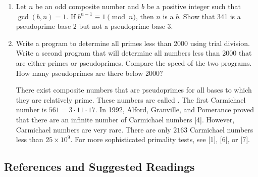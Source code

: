 {\begin{enumerate}
\begin{minipage}[t]{4.6in}
\begin{minipage}[t]{2.25in}
\begin{itemize}
 \item[{\bf (f)}]
631
 
\end{itemize}
\end{minipage}
\end{minipage}
 
\vspace{2pt}        %
 
 
\bf\item\rm
Let $n$ be an odd composite number and $b$ be a positive integer such
that $\gcd(b, n) = 1$. If $b^{n-1} \equiv 1 \pmod{n}$, then $n$ is a
 $b$. Show that 341 is a pseudoprime base 2 but
not a pseudoprime base 3.
 
 
\bf\item\rm
Write a program to determine all primes less than 2000 using
trial division. Write a second program that will determine all numbers
less than 2000 that are either primes or pseudoprimes. Compare the
speed of the two programs.  How many pseudoprimes are there below
2000? 
 
 
There exist composite numbers that are pseudoprimes for all bases to
which they are relatively prime.  These numbers are called . The first Carmichael
number is $561 = 3 \cdot 11 \cdot 17$.  In 1992, Alford, Granville, and
Pomerance proved that there are an infinite number of Carmichael
numbers [4].  However, Carmichael numbers are very rare.  There are
only $2163$ Carmichael numbers less than $25 \times 10^9$. For more
sophisticated primality tests, see [1], [6], or [7].  
 
 
\end{enumerate}
}
 
 
\subsection*{References and Suggested Readings}
 
